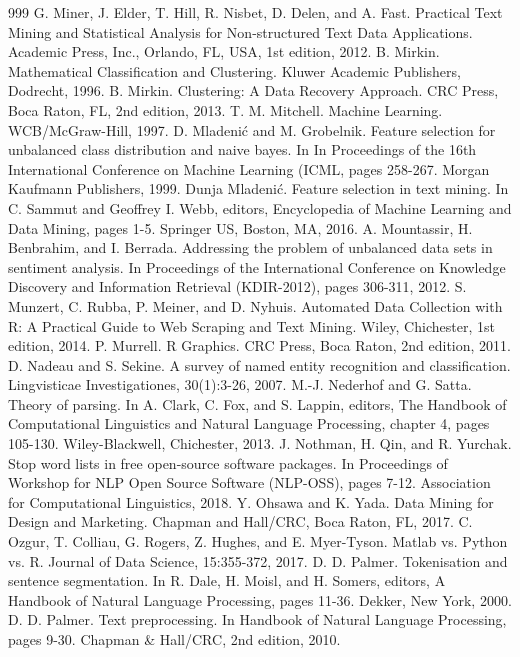 \documentclass[11pt,openany,executivepaper]{book}
\begin{document}
\begin{thebibliography}{999}
 G. Miner, J. Elder, T. Hill, R. Nisbet, D. Delen, and A. Fast. Practical Text Mining and Statistical Analysis for Non-structured Text Data Applications. Academic Press, Inc., Orlando, FL, USA, 1st edition, 2012.
 B. Mirkin. Mathematical Classification and Clustering. Kluwer Academic Publishers, Dodrecht, 1996.
 B. Mirkin. Clustering: A Data Recovery Approach. CRC Press, Boca Raton, FL, 2nd edition, 2013.
 T. M. Mitchell. Machine Learning. WCB/McGraw-Hill, 1997.
 D. Mladenić and M. Grobelnik. Feature selection for unbalanced class distribution and naive bayes. In In Proceedings of the 16th International Conference on Machine Learning (ICML, pages 258-267. Morgan Kaufmann Publishers, 1999.
 Dunja Mladenić. Feature selection in text mining. In C. Sammut and Geoffrey I. Webb, editors, Encyclopedia of Machine Learning and Data Mining, pages 1-5. Springer US, Boston, MA, 2016.
 A. Mountassir, H. Benbrahim, and I. Berrada. Addressing the problem of unbalanced data sets in sentiment analysis. In Proceedings of the International Conference on Knowledge Discovery and Information Retrieval (KDIR-2012), pages 306-311, 2012.
 S. Munzert, C. Rubba, P. Meiner, and D. Nyhuis. Automated Data Collection with R: A Practical Guide to Web Scraping and Text Mining. Wiley, Chichester, 1st edition, 2014.
 P. Murrell. R Graphics. CRC Press, Boca Raton, 2nd edition, 2011.
 D. Nadeau and S. Sekine. A survey of named entity recognition and classification. Lingvisticae Investigationes, 30(1):3-26, 2007.
 M.-J. Nederhof and G. Satta. Theory of parsing. In A. Clark, C. Fox, and S. Lappin, editors, The Handbook of Computational Linguistics and Natural Language Processing, chapter 4, pages 105-130. Wiley-Blackwell, Chichester, 2013.
 J. Nothman, H. Qin, and R. Yurchak. Stop word lists in free open-source software packages. In Proceedings of Workshop for NLP Open Source Software (NLP-OSS), pages 7-12. Association for Computational Linguistics, 2018.
 Y. Ohsawa and K. Yada. Data Mining for Design and Marketing. Chapman and Hall/CRC, Boca Raton, FL, 2017.
 C. Ozgur, T. Colliau, G. Rogers, Z. Hughes, and E. Myer-Tyson. Matlab vs. Python vs. R. Journal of Data Science, 15:355-372, 2017.
 D. D. Palmer. Tokenisation and sentence segmentation. In R. Dale, H. Moisl, and H. Somers, editors, A Handbook of Natural Language Processing, pages 11-36. Dekker, New York, 2000.
 D. D. Palmer. Text preprocessing. In Handbook of Natural Language Processing, pages 9-30. Chapman \& Hall/CRC, 2nd edition, 2010.

\end{thebibliography}
\end{document}
